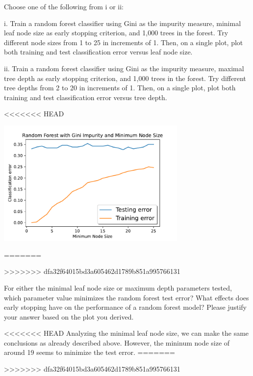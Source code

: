 \indent\problem[4] Choose one of the following from i or ii: \smallskip 

\noindent i. Train a random forest classifier using Gini as the impurity measure, minimal leaf node size as early stopping criterion, and 1,000 trees in the forest. Try different node sizes from 1 to 25 in increments of 1. Then, on a single plot, plot both training and test classification error versus
leaf node size.

ii. Train a random forest classifier using Gini as the impurity measure, maximal tree depth as early stopping criterion, and 1,000 trees in the forest. Try different tree depths from 2 to 20 in increments of 1. Then, on a single plot, plot both training and test classification error versus tree depth.

\begin{solution}
<<<<<<< HEAD
    \begin{center}
        \includegraphics[width=0.7\textwidth]{fig3.pdf}
    \end{center}
=======

>>>>>>> dfa32f64015bd3a605462d1789b851a995766131
\end{solution}

\problem[6]
For either the minimal leaf node size or maximum depth parameters tested, which parameter value minimizes the random forest test error? What effects does early stopping have on the performance of a random forest model?
Please justify your answer based on the plot you derived.

\begin{solution}
<<<<<<< HEAD
    Analyzing the minimal leaf node size, we can make the same conclusions as already described above. However, the mininum node size of around 19 seems to minimize the test error.
=======

>>>>>>> dfa32f64015bd3a605462d1789b851a995766131
\end{solution}

